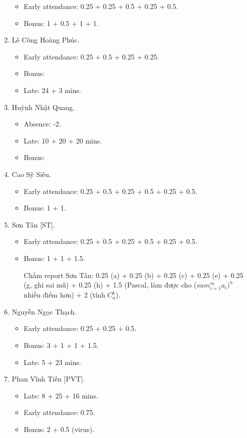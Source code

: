 \documentclass{article}
\begin{document}
\begin{enumerate}
	\begin{itemize}
		\item Early attendance: 0.25 + 0.25 + 0.5 + 0.25 + 0.5.
		\item Bonus: 1 + 0.5 + 1 + 1.
	\end{itemize}
	\item {\sc Lê Công Hoàng Phúc.}
	\begin{itemize}
		\item Early attendance: 0.25 + 0.5 + 0.25 + 0.25.
		\item Bonus: 
		\item Late: 24 + 3 mins.
	\end{itemize}
	\item {\sc Huỳnh Nhật Quang.}
	\begin{itemize}
		\item Absence: -2.
		\item Late: 10 + 20 + 20 mins.
		\item Bonus: 
	\end{itemize}
	\item {\sc Cao Sỹ Siêu.}
	\begin{itemize}
		\item Early attendance: 0.25 + 0.5 + 0.25 + 0.5 + 0.25 + 0.5.
		\item Bonus: 1 + 1.
	\end{itemize}
	\item {\sc Sơn Tân [ST].}
	\begin{itemize}
		\item Early attendance: 0.25 + 0.5 + 0.25 + 0.5 + 0.25 + 0.5.
		\item Bonus: 1 + 1 + 1.5.
		
		Chấm report Sơn Tân: 0.25 (a) + 0.25 (b) + 0.25 (c) + 0.25 (e) + 0.25 (g, ghi sai mũ) + 0.25 (h) + 1.5 (Pascal, làm được cho ($sum_{i=1}^m a_i)^n$ nhiều điểm hơn) + 2 (tính $C_n^k$).
	\end{itemize}
	\item {\sc Nguyễn Ngọc Thạch.}
	\begin{itemize}
		\item Early attendance: 0.25 + 0.25 + 0.5.
		\item Bonus: 3 + 1 + 1 + 1.5.
		\item Late: 5 + 23 mins.
	\end{itemize}
	\item {\sc Phan Vĩnh Tiến [PVT].}
	\begin{itemize}
		\item Late: 8 + 25 + 16 mins.
		\item Early attendance: 0.75.
		\item Bonus: 2 + 0.5 (virus).
	\end{itemize}
\end{enumerate}
\end{document}
